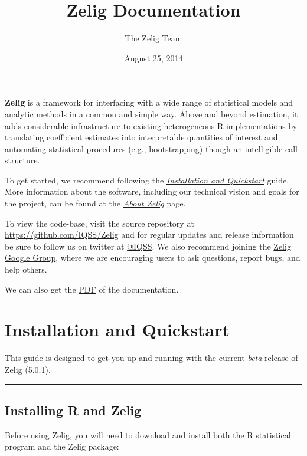\documentclass[letterpaper,10pt,english]{sphinxmanual}
\title{Zelig Documentation}
\date{August 25, 2014}
\author{The Zelig Team}
\begin{document}
\maketitle
\tableofcontents
{}\label{index::doc}


\textbf{Zelig} is a framework for interfacing with a wide range of statistical models and analytic methods in a common and simple way. Above and beyond estimation, it adds considerable infrastructure to existing heterogeneous R implementations by translating coefficient estimates into interpretable quantities of interest and automating statistical procedures (e.g., bootstrapping) though an intelligible call structure.

To get started, we recommend following the {\hyperref[installation_quickstart:installation-quickstart]{\emph{Installation and Quickstart}}} guide. More information about the software, including our technical vision and goals for the project, can be found at the {\hyperref[about:about]{\emph{About Zelig}}} page.

To view the code-base, visit the source repository at \href{https://github.com/IQSS/Zelig}{https://github.com/IQSS/Zelig} and for regular updates  and release information be sure to follow us on twitter at \href{https://twitter.com/IQSS}{@IQSS}. We also recommend joining the \href{https://groups.google.com/forum/\#!forum/zelig-statistical-software}{Zelig Google Group}, where we are encouraging users to ask questions, report bugs, and help others.

We can also get the \href{http://zeligproject.org/build/latex/Zelig.pdf}{PDF}
of the documentation.


\chapter{Installation and Quickstart}
\label{installation_quickstart::doc}\label{installation_quickstart:welcome-to-zelig}\label{installation_quickstart:installation-and-quickstart}\label{installation_quickstart:installation-quickstart}
This guide is designed to get you up and running with the current \emph{beta} release of Zelig (5.0.1).


\bigskip\hrule{}\bigskip



\section{Installing R and Zelig}
\label{installation_quickstart:installing-r-and-zelig}
Before using Zelig, you will need to download and install both the R statistical program and the Zelig package:
\end{document}
